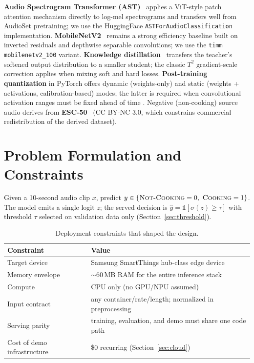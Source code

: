 \documentclass[11pt,a4paper]{article}
\newcommand{\cooking}{\textsc{Cooking}}
\newcommand{\notcooking}{\textsc{Not-Cooking}}
\begin{document}
\textbf{Audio Spectrogram Transformer (AST)}~\cite{gong2021ast} applies a
ViT-style patch attention mechanism directly to log-mel spectrograms and
transfers well from AudioSet pretraining; we use the HuggingFace
\texttt{ASTForAudioClassification} implementation.
\textbf{MobileNetV2}~\cite{sandler2018mobilenetv2} remains a strong
efficiency baseline built on inverted residuals and depthwise separable
convolutions; we use the \texttt{timm} \texttt{mobilenetv2\_100} variant.
\textbf{Knowledge distillation}~\cite{hinton2015distilling} transfers the
teacher's softened output distribution to a smaller student; the classic
$T^2$ gradient-scale correction applies when mixing soft and hard losses.
\textbf{Post-training quantization} in PyTorch offers dynamic (weights-only)
and static (weights + activations, calibration-based) modes; the latter is
required when convolutional activation ranges must be fixed ahead of time
\cite{pytorch-quant}. Negative (non-cooking) source audio derives from
\textbf{ESC-50}~\cite{piczak2015esc} (CC BY-NC 3.0, which constrains
commercial redistribution of the derived dataset).

\section{Problem Formulation and Constraints}\label{sec:problem}

Given a 10-second audio clip $x$, predict $y \in \{\text{\notcooking{}}=0,\
\text{\cooking{}}=1\}$. The model emits a single logit $z$; the served
decision is $\hat y = \mathbb{1}[\sigma(z) \geq \tau]$ with threshold $\tau$
selected on validation data only (Section~\ref{sec:threshold}).

\begin{table}[h]
\centering\small
\begin{tabular}{@{}ll@{}}
\toprule
\textbf{Constraint} & \textbf{Value} \\
\midrule
Target device                & Samsung SmartThings hub-class edge device \\
Memory envelope              & $\sim$60\,MB RAM for the entire inference stack \\
Compute                      & CPU only (no GPU/NPU assumed) \\
Input contract               & any container/rate/length; normalized in preprocessing \\
Serving parity               & training, evaluation, and demo must share one code path \\
Cost of demo infrastructure  & \$0 recurring (Section~\ref{sec:cloud}) \\
\bottomrule
\end{tabular}
\caption{Deployment constraints that shaped the design.}
\label{tab:constraints}
\end{table}
\end{document}

